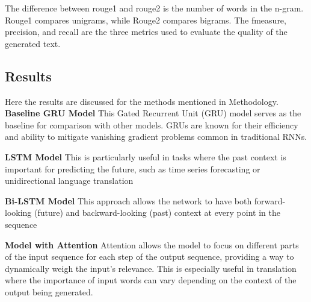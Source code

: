 \documentclass{article}
\begin{document}
The difference between rouge1 and rouge2 is the number of words in the n-gram. Rouge1 compares unigrams, while Rouge2 compares bigrams. The fmeasure, precision, and recall are the three metrics used to evaluate the quality of the generated text.

\subsection{Results}
Here the results are discussed for the methods mentioned in Methodology.
\textbf{Baseline GRU Model}
This Gated Recurrent Unit (GRU) model serves as the baseline for comparison with other models. GRUs are known for their efficiency and ability to mitigate vanishing gradient problems common in traditional RNNs.



\textbf{LSTM Model}
This is particularly useful in tasks where the past context is important for predicting the future, such as time series forecasting or unidirectional language translation





\textbf{Bi-LSTM Model}
This approach allows the network to have both forward-looking (future) and backward-looking (past) context at every point in the sequence



\textbf{Model with Attention}
Attention allows the model to focus on different parts of the input sequence for each step of the output sequence, providing a way to dynamically weigh the input's relevance. This is especially useful in translation where the importance of input words can vary depending on the context of the output being generated. 
\end{document}
